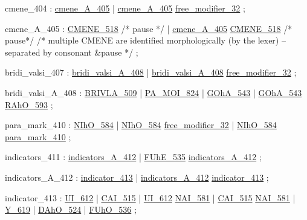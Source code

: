\label{html:y404}
cmene_404               :  \hyperref[html:y405]{cmene_A_405}
                        |  \hyperref[html:y405]{cmene_A_405}  \hyperref[html:y32]{free_modifier_32}
                        ;

\label{html:y405}
cmene_A_405             :  \hyperref[html:y518]{CMENE_518}  /* pause */
                        |  \hyperref[html:y405]{cmene_A_405}  \hyperref[html:y518]{CMENE_518}  /* pause*/
/* multiple CMENE are identified morphologically (by the lexer) -- separated by
   consonant \&pause */
                        ;

\label{html:y407}
bridi_valsi_407         :  \hyperref[html:y408]{bridi_valsi_A_408}
                        |  \hyperref[html:y408]{bridi_valsi_A_408}  \hyperref[html:y32]{free_modifier_32}
                        ;

\label{html:y408}
bridi_valsi_A_408       :  \hyperref[html:y509]{BRIVLA_509}
                        |  \hyperref[html:y824]{PA_MOI_824}
                        |  \hyperref[html:y543]{GOhA_543}
                        |  \hyperref[html:y543]{GOhA_543}  \hyperref[html:y593]{RAhO_593}
                        ;

\label{html:y410}
para_mark_410           :  \hyperref[html:y584]{NIhO_584}
                        |  \hyperref[html:y584]{NIhO_584}  \hyperref[html:y32]{free_modifier_32}
                        |  \hyperref[html:y584]{NIhO_584}  \hyperref[html:y410]{para_mark_410}
                        ;

\label{html:y411}
indicators_411          :  \hyperref[html:y412]{indicators_A_412}
                        |  \hyperref[html:y535]{FUhE_535}  \hyperref[html:y412]{indicators_A_412}
                        ;

\label{html:y412}
indicators_A_412        :  \hyperref[html:y413]{indicator_413}
                        |  \hyperref[html:y412]{indicators_A_412}  \hyperref[html:y413]{indicator_413}
                        ;

\label{html:y413}
indicator_413           :  \hyperref[html:y612]{UI_612}
                        |  \hyperref[html:y515]{CAI_515}
                        |  \hyperref[html:y612]{UI_612}  \hyperref[html:y581]{NAI_581}
                        |  \hyperref[html:y515]{CAI_515}  \hyperref[html:y581]{NAI_581}
                        |  \hyperref[html:y619]{Y_619}
                        |  \hyperref[html:y524]{DAhO_524}
                        |  \hyperref[html:y536]{FUhO_536}
                        ;


